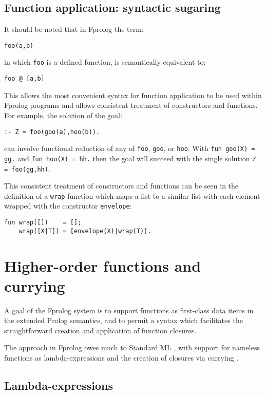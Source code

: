 \documentclass[a4paper,11pt,twoside]{article}
\begin{document}
\subsection{Function application: syntactic sugaring}
It should be noted that in Fprolog the term:

\texttt{foo(a,b)}

in which \texttt{foo} is a defined function, is semantically equivalent to:

\texttt{foo @ [a,b]}

This allows the most convenient syntax for function application to be used
within Fprolog programs and allows consistent treatment of constructors and
functions. For example, the solution of the goal:

\texttt{:- Z = foo(goo(a),hoo(b)).}

can involve functional reduction of any of \texttt{foo}, \texttt{goo}, or
\texttt{hoo}.  With
\texttt{fun goo(X) = gg.} and \texttt{fun hoo(X) = hh.} then the goal
will succeed with the single solution \texttt{Z = foo(gg,hh)}.

This consistent treatment of constructors and functions can be seen in the
definition of a \texttt{wrap}
function which maps a list to a similar list with each element wrapped with
the constructor \texttt{envelope}:
\begin{verbatim}
fun wrap([])    = [];
    wrap([X|T]) = [envelope(X)|wrap(T)].
\end{verbatim}

\section{Higher-order functions and currying} %
\label{higher-order}

A goal of the Fprolog system is to support functions as first-class data
items in the extended Prolog semantics, and to permit a syntax which 
facilitates the straightforward creation and application of function closures.

The approach in Fprolog owes much to Standard ML \cite{MTH90}, with support for
nameless functions as lambda-expressions and the creation of closures
via currying \cite{Cur30, Sch24}.

\subsection{Lambda-expressions}
\end{document}
